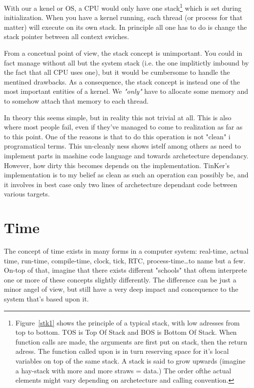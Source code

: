 		With our a kenel or OS, a CPU would only have one stack\footnote{Figure~\ref{stk1} shows the principle of a typical stack, with low adresses from top to bottom. TOS is Top Of Stack and BOS is Bottom Of Stack. When function calls are made, the arguments are first put on stack, then the return adress. The function called upon is in turn reserving space for it's local variables on top of the same stack. A stack is said to grow upwards (imagine a hay-stack with more and more straws = data.) The order ofthe actual elements might vary depending on archetecture and calling convention.} which is set during initialization. When you have a kernel running, each thread (or process for that matter) will execute on its own stack. In principle all one has to do is change the stack pointer between all context swiches.

		From a concetual point of view, the stack concept is unimportant. You could in fact manage without all but the system stack (i.e. the one implitictly imbound by the fact that all CPU uses one), but it would be cumbersome to handle the mentined drawbacks. As a consequence, the stack concept is instead one of the most important entities of a kernel. We \textit{"only"} have to allocate some memory and to somehow attach that memory to each thread. 

		In theory this seems simple, but in reality this not trivial at all. This is also where most people fail, even if they've managed to come to realization as far as to this point. One of the reasons is that to do this operation is not "clean" i programatical terms. This un-cleanly ness shows istelf among others as need to implement parts in mashine code language and towards archetecture dependancy. However, how dirty this becomes depends on the implementation. TinKer's implementation is to my belief as clean as such an operation can possibly be, and it involves in best case only two lines of archetecture dependant code between various targets.

	\section{Time}
		The concept of time exists in many forms in a computer system: real-time, actual time, run-time, compile-time, clock, tick, RTC, process-time\ldots to name but a few. On-top of that, imagine that there exists different "schools" that oftem interprete one or more of these concepts slightly differently. The difference can be just a minor angel of view, but still have a very deep impact and concequence to the system that's based upon it.

